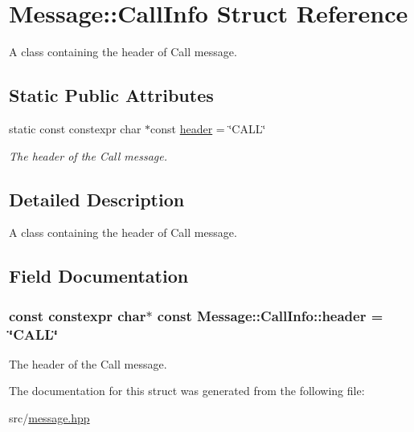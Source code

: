 \hypertarget{struct_message_1_1_call_info}{}\section{Message\+:\+:Call\+Info Struct Reference}
\label{struct_message_1_1_call_info}


A class containing the header of Call message.  


\subsection*{Static Public Attributes}
\begin{DoxyCompactItemize}
\item 
static const constexpr char $\ast$const \hyperlink{struct_message_1_1_call_info_a8abd3d3a05a677da712bef3ad8bd99dd}{header} = \char`\"{}C\+A\+LL\char`\"{}
\begin{DoxyCompactList}\small\item\em The header of the Call message. \end{DoxyCompactList}\end{DoxyCompactItemize}


\subsection{Detailed Description}
A class containing the header of Call message. 

\subsection{Field Documentation}
\subsubsection[{\texorpdfstring{header}{header}}]{\setlength{\rightskip}{0pt plus 5cm}const constexpr char$\ast$ const Message\+::\+Call\+Info\+::header = \char`\"{}C\+A\+LL\char`\"{}\hspace{0.3cm}{\ttfamily [static]}}\hypertarget{struct_message_1_1_call_info_a8abd3d3a05a677da712bef3ad8bd99dd}{}\label{struct_message_1_1_call_info_a8abd3d3a05a677da712bef3ad8bd99dd}


The header of the Call message. 



The documentation for this struct was generated from the following file\+:\begin{DoxyCompactItemize}
\item 
src/\hyperlink{message_8hpp}{message.\+hpp}\end{DoxyCompactItemize}
